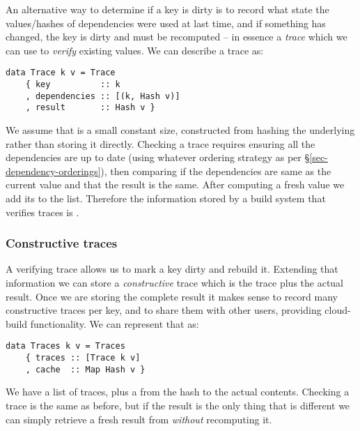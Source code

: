 An alternative way to determine if a key is dirty is to record what state the
values/hashes of dependencies were used at last time, and if something has
changed, the key is dirty and must be recomputed -- in essence a \emph{trace}
which we can use to \emph{verify} existing values. We can describe a trace as:

\begin{verbatim}
data Trace k v = Trace
    { key          :: k
    , dependencies :: [(k, Hash v)]
    , result       :: Hash v }
\end{verbatim}

We assume that  is a small constant size, constructed from hashing the
underlying  rather than storing it directly. Checking a trace requires
ensuring all the dependencies are up to date (using whatever ordering strategy
as per \S\ref{sec-dependency-orderings}), then comparing if the dependencies are
same as the current value and that the result is the same. After computing a
fresh value we add its  to the list. Therefore the information stored
by a build system that verifies traces is \hs{[Trace k v]}.


\subsubsection{Constructive traces}\label{sec-constructive-traces}

A verifying trace allows us to mark a key dirty and rebuild it. Extending that information we can store a \emph{constructive} trace which is the trace plus the actual result. Once we are storing the complete result it makes sense to record many constructive traces per key, and to share them with other users, providing cloud-build functionality. We can represent that as:


\begin{verbatim}
data Traces k v = Traces
    { traces :: [Trace k v]
    , cache  :: Map Hash v }
\end{verbatim}

We have a list of traces, plus a  from the hash to the actual contents. Checking a trace is the same as before, but if the result is the only thing that is different we can simply retrieve a fresh result from  \emph{without} recomputing it.

